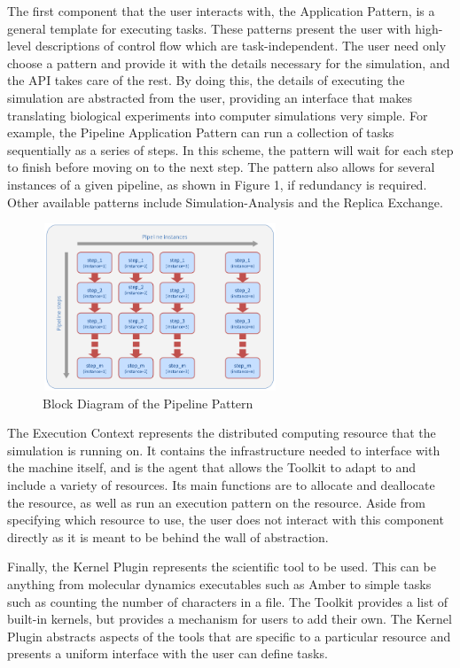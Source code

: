 \documentclass[]{article}
\begin{document}
			The first component that the user interacts with, the Application Pattern, is a general template for executing tasks. These patterns present the user with high-level descriptions of control flow which are task-independent. The user need only choose a pattern and provide it with the details necessary for the simulation, and the API takes care of the rest. By doing this, the details of executing the simulation are abstracted from the user, providing an interface that makes translating biological experiments into computer simulations very simple. For example, the Pipeline Application Pattern can run a collection of tasks sequentially as a series of steps. In this scheme, the pattern will wait for each step to finish before moving on to the next step. The pattern also allows for several instances of a given pipeline, as shown in Figure 1, if redundancy is required. Other available patterns include Simulation-Analysis and the Replica Exchange.

			\begin{figure}[H]
				\centering
				\includegraphics[width=7cm,height=5cm]{diagrams/pipeline_pattern}
				\caption{Block Diagram of the Pipeline Pattern}
				\label{fig:pipeline_block_diagram}
			\end{figure}

			The Execution Context represents the distributed computing resource that the simulation is running on. It contains the infrastructure needed to interface with the machine itself, and is the agent that allows the Toolkit to adapt to and include a variety of resources. Its main functions are to allocate and deallocate the resource, as well as run an execution pattern on the resource. Aside from specifying which resource to use, the user does not interact with this component directly as it is meant to be behind the wall of abstraction. 

			Finally, the Kernel Plugin represents the scientific tool to be used. This can be anything from molecular dynamics executables such as Amber to simple tasks such as counting the number of characters in a file. The Toolkit provides a list of built-in kernels, but provides a mechanism for users to add their own. The Kernel Plugin abstracts aspects of the tools that are specific to a particular resource and presents a uniform interface with the user can define tasks.
\end{document}

